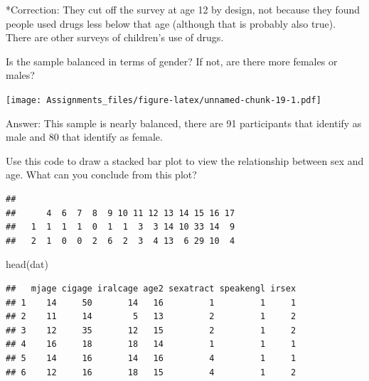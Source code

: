 \documentclass[
]{article}
\newenvironment{Shaded}{\begin{snugshade}}{\end{snugshade}}
\newcommand{\FunctionTok}[1]{\textcolor[rgb]{0.00,0.00,0.00}{#1}}
\newcommand{\NormalTok}[1]{#1}
\newcommand{\SpecialCharTok}[1]{\textcolor[rgb]{0.00,0.00,0.00}{#1}}
\begin{document}
*Correction: They cut off the survey at age 12 by design, not because
they found people used drugs less below that age (although that is
probably also true). There are other surveys of children's use of drugs.

Is the sample balanced in terms of gender? If not, are there more
females or males?

\begin{Shaded}
\end{Shaded}

\texttt{[image: Assignments\_files/figure-latex/unnamed-chunk-19-1.pdf]}

Answer: This sample is nearly balanced, there are 91 participants that
identify as male and 80 that identify as female.

Use this code to draw a stacked bar plot to view the relationship
between sex and age. What can you conclude from this plot?

\begin{Shaded}
\end{Shaded}

\begin{verbatim}
##    
##      4  6  7  8  9 10 11 12 13 14 15 16 17
##   1  1  1  1  0  1  1  3  3 14 10 33 14  9
##   2  1  0  0  2  6  2  3  4 13  6 29 10  4
\end{verbatim}

\begin{Shaded}
\begin{Highlighting}[]
\FunctionTok{head}\NormalTok{(dat)}
\end{Highlighting}
\end{Shaded}

\begin{verbatim}
##   mjage cigage iralcage age2 sexatract speakengl irsex
## 1    14     50       14   16         1         1     1
## 2    11     14        5   13         2         1     2
## 3    12     35       12   15         2         1     2
## 4    16     18       18   14         1         1     1
## 5    14     16       14   16         4         1     1
## 6    12     16       18   15         4         1     2
\end{verbatim}
\end{document}
